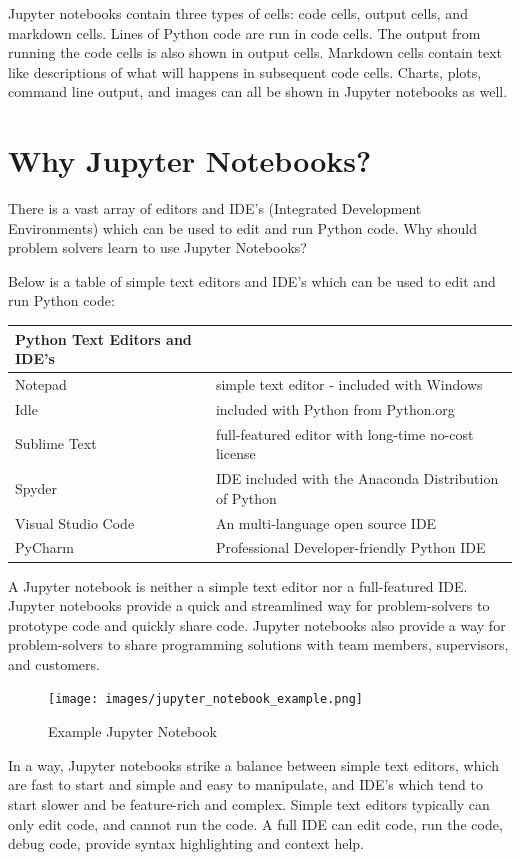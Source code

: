 \documentclass{book}
\begin{document}
    
        Jupyter notebooks contain three types of cells: code cells, output
cells, and markdown cells. Lines of Python code are run in code cells.
The output from running the code cells is also shown in output cells.
Markdown cells contain text like descriptions of what will happens in
subsequent code cells. Charts, plots, command line output, and images
can all be shown in Jupyter notebooks as well.
    




    
        \section{Why Jupyter Notebooks?}\label{why-jupyter-notebooks}
    




    
        There is a vast array of editors and IDE's (Integrated Development
Environments) which can be used to edit and run Python code. Why should
problem solvers learn to use Jupyter Notebooks?

Below is a table of simple text editors and IDE's which can be used to
edit and run Python code:

\begin{longtable}[]{@{}ll@{}}
\toprule
Python Text Editors and IDE's &\tabularnewline
\midrule
\endhead
Notepad & simple text editor - included with Windows\tabularnewline
Idle & included with Python from Python.org\tabularnewline
Sublime Text & full-featured editor with long-time no-cost
license\tabularnewline
Spyder & IDE included with the Anaconda Distribution of
Python\tabularnewline
Visual Studio Code & An multi-language open source IDE\tabularnewline
PyCharm & Professional Developer-friendly Python IDE\tabularnewline
\bottomrule
\end{longtable}

A Jupyter notebook is neither a simple text editor nor a full-featured
IDE. Jupyter notebooks provide a quick and streamlined way for
problem-solvers to prototype code and quickly share code. Jupyter
notebooks also provide a way for problem-solvers to share programming
solutions with team members, supervisors, and customers.

\begin{figure}
\centering
\texttt{[image: images/jupyter\_notebook\_example.png]}
\caption{Example Jupyter Notebook}
\end{figure}

In a way, Jupyter notebooks strike a balance between simple text
editors, which are fast to start and simple and easy to manipulate, and
IDE's which tend to start slower and be feature-rich and complex. Simple
text editors typically can only edit code, and cannot run the code. A
full IDE can edit code, run the code, debug code, provide syntax
highlighting and context help.
    
\end{document}
